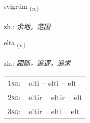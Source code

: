 \documentclass[frontgrid, backgrid]{flacards}\usepackage[]{graphicx}\usepackage[]{xcolor}
\begin{document}
\renewcommand{\flhead}{\vskip5pt \fboxsep=0pt {\small\bfseries\footnotesize Nafnorð | 名词}}
\renewcommand{\fcfoot}{\vskip5pt \fboxsep=0pt \hspace{2pt}{\small\bfseries\footnotesize 3K}}

\renewcommand{\blhead}{\vskip5pt {\small\bfseries\footnotesize Nafnorð | 名词 }}
\renewcommand{\bcfoot}{\vskip5pt \hspace{2pt}{\small\bfseries\footnotesize 3K}}


{svigrúm \small{\textsubscript{(\textit{n.})}} \\[1ex] %
\textphonetic{[svɪɣrum]} \\
zh.: \emph{余地，范围} \\  [2ex]
\renewcommand*{\arraystretch}{0.8}
}

\renewcommand{\flhead}{\vskip5pt \fboxsep=0pt {\small\bfseries\footnotesize Sagnorð | 动词}}
\renewcommand{\fcfoot}{\vskip5pt \fboxsep=0pt \hspace{2pt}{\small\bfseries\footnotesize 3K}}

\renewcommand{\blhead}{\vskip5pt {\small\bfseries\footnotesize Sagnorð | 动词 }}
\renewcommand{\bcfoot}{\vskip5pt \hspace{2pt}{\small\bfseries\footnotesize 3K}}


{elta \small{\textsubscript{(\textit{v.})}} \\[1ex] %
\textphonetic{[ɛl̥ta]} \\
zh.: \emph{跟随，追逐，追求} \\  [2ex]
\renewcommand*{\arraystretch}{0.8}
\begin{tabular}{p{1cm}l}
\textsc{1sg}: & elti -- elti -- elt \\ 
\textsc{2sg}: & eltir -- eltir -- elt \\ 
\textsc{3sg}: & eltir -- elti -- elt \\ 
\end{tabular}
}
\end{document}
